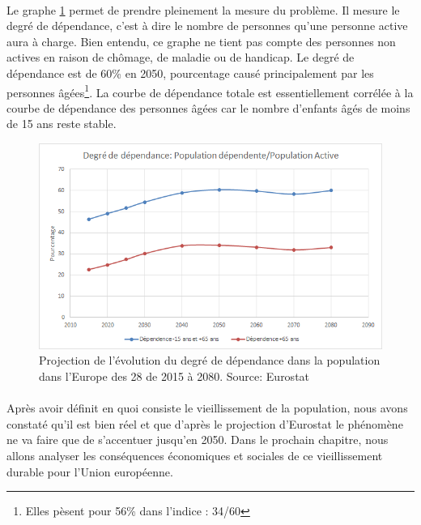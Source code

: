 \paragraph{}Le graphe \ref{dependance} permet de prendre pleinement la mesure du problème. Il mesure le degré de dépendance, c'est à dire le nombre de personnes qu’une personne active aura à charge. Bien entendu, ce graphe ne tient pas compte des personnes non actives en raison de chômage, de maladie ou de handicap. Le degré de dépendance est de 60\% en 2050, pourcentage causé principalement par les personnes âgées\footnote{ Elles pèsent pour 56\% dans l’indice : 34/60}. La courbe de dépendance totale est essentiellement corrélée à la courbe de dépendance des personnes âgées car le nombre d’enfants âgés de moins de 15 ans reste stable. 



\begin{figure}[h!]
    \begin{center}
        \includegraphics[scale=0.6]{document/dependance.png}
        \caption{Projection de l'évolution du degré de dépendance dans la population dans l'Europe des 28 de 2015 à 2080. Source: Eurostat~\citep{eurostat_europop13}}
        \label{dependance}
    \end{center}
\end{figure}

\paragraph{}Après avoir définit en quoi consiste le vieillissement de la population, nous avons constaté qu'il est bien réel et que d'après le projection d'Eurostat le phénomène ne va faire que de s'accentuer jusqu'en 2050. Dans le prochain chapitre, nous allons analyser les conséquences économiques et sociales de ce vieillissement durable pour l’Union européenne.
